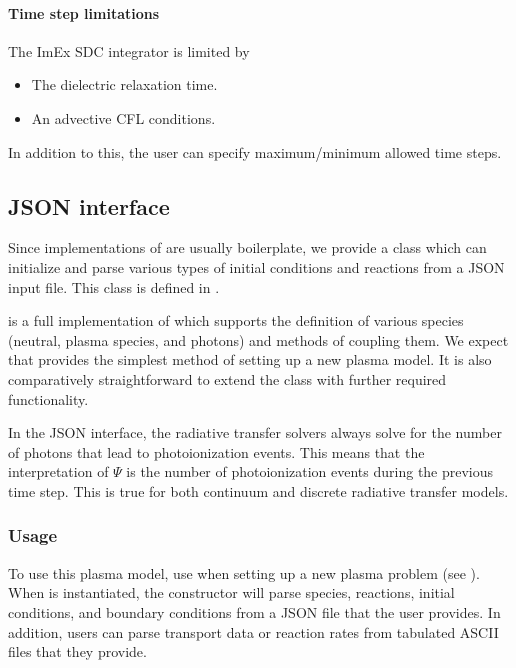 \documentclass[letterpaper,10pt,english]{sphinxmanual}
\begin{document}
\paragraph{Time step limitations}
\label{\detokenize{Applications/CdrPlasmaModel:id2}}
The ImEx SDC integrator is limited by
\begin{itemize}
\item {} 
The dielectric relaxation time.

\item {} 
An advective CFL conditions.

\end{itemize}

In addition to this, the user can specify maximum/minimum allowed time steps.


\subsection{JSON interface}
\label{\detokenize{Applications/CdrPlasmaModel:json-interface}}\label{\detokenize{Applications/CdrPlasmaModel:chap-cdrplasmajson}}
Since implementations of {\hyperref[\detokenize{Applications/CdrPlasmaModel:chap-cdrplasmaphysics}]{}} are usually boilerplate, we provide a class  which can initialize and parse various types of initial conditions and reactions from a JSON input file.
This class is defined in .

 is a full implementation of  which supports the definition of various species (neutral, plasma species, and photons) and methods of coupling them.
We expect that  provides the simplest method of setting up a new plasma model.
It is also comparatively straightforward to extend the class with further required functionality.

In the JSON interface, the radiative transfer solvers always solve for the number of photons that lead to photoionization events.
This means that the interpretation of \(\Psi\) is the number of photoionization events during the previous time step.
This is true for both continuum and discrete radiative transfer models.


\subsubsection{Usage}
\label{\detokenize{Applications/CdrPlasmaModel:usage}}
To use this plasma model, use  when setting up a new plasma problem (see {\hyperref[\detokenize{Applications/CdrPlasmaModel:chap-cdrplasmanewproblem}]{}}).
When  is instantiated, the constructor will parse species, reactions, initial conditions, and boundary conditions from a JSON file that the user provides.
In addition, users can parse transport data or reaction rates from tabulated ASCII files that they provide.
\end{document}
